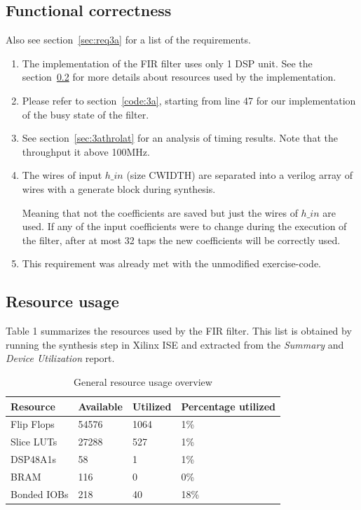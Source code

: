 \documentclass[a4paper,twoside,11pt, fleqn]{article}
\begin{document}
\subsection{Functional correctness}
Also see section~\ref{sec:req3a} for a list of the requirements.
\begin{enumerate}
	\item The implementation of the FIR filter uses only 1 DSP unit. See the				section~\ref{sec:resc3a} for more details about resources used by 		the implementation.
	\item Please refer to section~\ref{code:3a}, starting from line 47 for our implementation of the busy state of the filter.
	\item See section~\ref{sec:3athrolat} for an analysis of timing results. Note that the throughput it above 100MHz.
	\item The wires of input $h\_in$ (size CWIDTH) are separated into a verilog 			array of wires with a generate block during synthesis. 
	
	Meaning that not the coefficients are saved but just the wires of $h\_in$ are used. If any of the input coefficients were to change during the execution of the filter, after at most 32 taps the new coefficients will be correctly used.
	\item This requirement was already met with the unmodified exercise-code.
\end{enumerate}

\subsection{Resource usage}
\label{sec:resc3a}

Table 1 summarizes the resources used by the FIR filter. This list is obtained by running the synthesis step in Xilinx ISE and extracted from the \textit{Summary} and \textit{Device Utilization} report.
\begin{table}[h]
\begin{tabular}{|l|l|l|l|}
\hline
\textbf{Resource} & \textbf{Available} & \textbf{Utilized} & \textbf{Percentage utilized}\\
\hline
Flip Flops	& 54576 & 1064 	& 1\%\\
Slice LUTs 	& 27288 & 527 	& 1\%\\
DSP48A1s	& 58 	& 1 	& 1\%\\
BRAM		& 116 	& 0 	& 0\%\\
Bonded IOBs	& 218 	& 40 	& 18\%\\
\hline
\end{tabular}
\caption{General resource usage overview}
\end{table}
\end{document}
